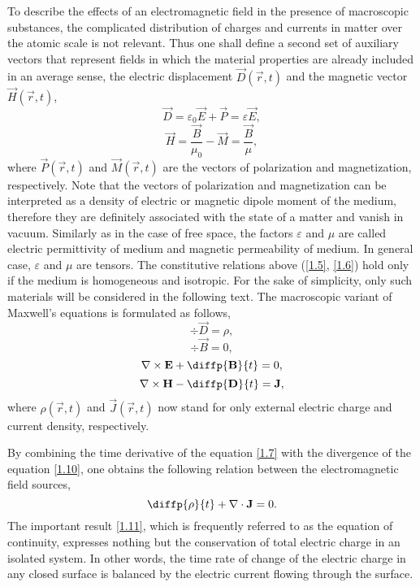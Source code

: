 To describe the effects of an electromagnetic field in the presence of macroscopic substances, the complicated distribution of charges and currents in matter over the atomic scale is not relevant. Thus one shall define a second set of auxiliary vectors that represent fields in which the material properties are already included in an average sense, the electric displacement $ \vec{D}\left( \vec{r}, t \right) $ and the magnetic vector $ \vec{H}\left( \vec{r}, t \right) $,
\begin{equation}
\label{1.5}
\vec{D} = \varepsilon_0 \vec{E} + \vec{P} = \varepsilon \vec{E},
\end{equation}
\begin{equation}
\label{1.6}
\vec{H} = \frac{\vec{B}}{\mu_0} - \vec{M} = \frac{\vec{B}}{\mu},
\end{equation}
where $ \vec{P}\left( \vec{r}, t \right) $ and $ \vec{M}\left( \vec{r}, t \right) $ are the vectors of polarization and magnetization, respectively. Note that the vectors of polarization and magnetization can be interpreted as a density of electric or magnetic dipole moment of the medium, therefore they are definitely associated with the state of a matter and vanish in vacuum. Similarly as in the case of free space, the factors $ \varepsilon $ and $ \mu $ are called electric permittivity of medium and magnetic permeability of medium. In general case, $ \varepsilon $ and $ \mu $ are tensors. The constitutive relations above (\ref{1.5}, \ref{1.6}) hold only if the medium is homogeneous and isotropic. For the sake of simplicity, only such materials will be considered in the following text. The macroscopic variant of Maxwell's equations is formulated as follows,
\begin{equation}
\label{1.7}
\div{\vec{D}} = \rho,
\end{equation}
\begin{equation}
\label{1.8}
\div{\vec{B}} = 0,
\end{equation}
\begin{equation}
\label{1.9}
\rot{\vec{E}} + \diffp{\vec{B}}{t} = 0,
\end{equation}
\begin{equation}
\label{1.10}
\rot{\vec{H}} - \diffp{\vec{D}}{t} = \vec{J},
\end{equation}
where $ \rho\left(\vec{r}, t \right) $ and $ \vec{J}\left(\vec{r}, t \right) $ now stand for only external electric charge and current density, respectively.

By combining the time derivative of the equation \ref{1.7} with the divergence of the equation \ref{1.10}, one obtains the following relation between the electromagnetic field sources,
\begin{equation}
\label{1.11}
\diffp{\rho}{t} + \div{\vec{J}} = 0.
\end{equation}
The important result \ref{1.11}, which is frequently referred to as the equation of continuity, expresses nothing but the conservation of total electric charge in an isolated system. In other words, the time rate of change of the electric charge in any closed surface is balanced by the electric current flowing through the surface.